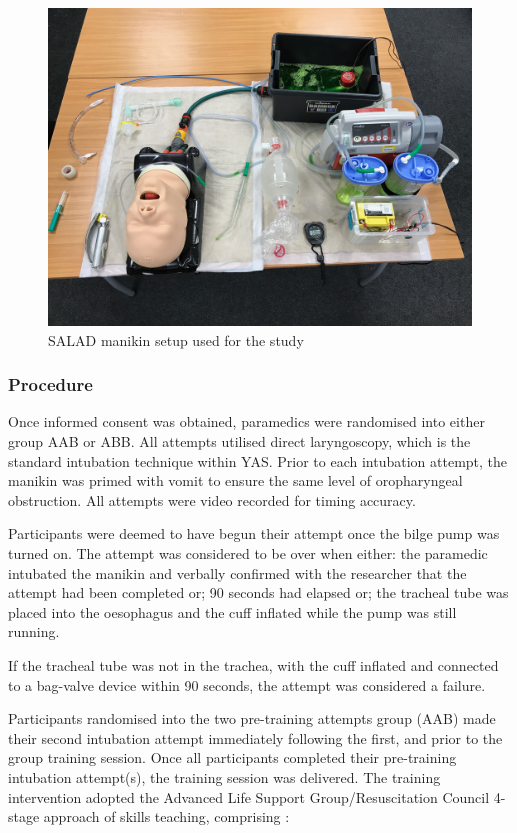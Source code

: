 \documentclass[]{article}
\begin{document}
\begin{figure}
\includegraphics[width=7in]{images/figure-1} \caption{SALAD manikin setup used for the study}\label{fig:figure1}
\end{figure}

\hypertarget{procedure}{%
\subsubsection{Procedure}\label{procedure}}

Once informed consent was obtained, paramedics were randomised into
either group AAB or ABB. All attempts utilised direct laryngoscopy,
which is the standard intubation technique within YAS. Prior to each
intubation attempt, the manikin was primed with vomit to ensure the same
level of oropharyngeal obstruction. All attempts were video recorded for
timing accuracy.

Participants were deemed to have begun their attempt once the bilge pump
was turned on. The attempt was considered to be over when either: the
paramedic intubated the manikin and verbally confirmed with the
researcher that the attempt had been completed or; 90 seconds had
elapsed or; the tracheal tube was placed into the oesophagus and the
cuff inflated while the pump was still running.

If the tracheal tube was not in the trachea, with the cuff inflated and
connected to a bag-valve device within 90 seconds, the attempt was
considered a failure.

Participants randomised into the two pre-training attempts group (AAB)
made their second intubation attempt immediately following the first,
and prior to the group training session. Once all participants completed
their pre-training intubation attempt(s), the training session was
delivered. The training intervention adopted the Advanced Life Support
Group/Resuscitation Council 4-stage approach of skills teaching,
comprising \citep{bullock_pocket_2008}:
\end{document}
